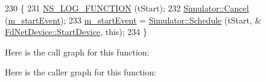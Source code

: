 \begin{DoxyCode}
230 \{
231   \hyperlink{log-macros-disabled_8h_a90b90d5bad1f39cb1b64923ea94c0761}{NS\_LOG\_FUNCTION} (tStart);
232   \hyperlink{classns3_1_1Simulator_a1b903a62d6117ef28f7ba3c6500689bf}{Simulator::Cancel} (\hyperlink{classns3_1_1FdNetDevice_a759e74ace56841b2ae47c69ff0276b2f}{m\_startEvent});
233   \hyperlink{classns3_1_1FdNetDevice_a759e74ace56841b2ae47c69ff0276b2f}{m\_startEvent} = \hyperlink{classns3_1_1Simulator_a671882c894a08af4a5e91181bf1eec13}{Simulator::Schedule} (tStart, &
      \hyperlink{classns3_1_1FdNetDevice_afec16ee9ae009f427348474f9e9c3c50}{FdNetDevice::StartDevice}, \textcolor{keyword}{this});
234 \}
\end{DoxyCode}


Here is the call graph for this function\+:




Here is the caller graph for this function\+:


